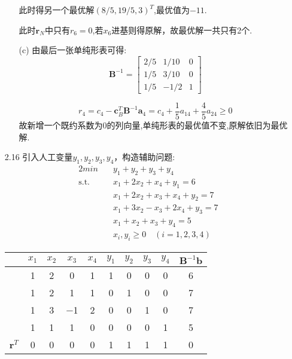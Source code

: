 \documentclass[UTF8]{ctexart}
\begin{document}
\begin{enumerate}
\begin{enumerate}
此时得另一个最优解$(8/5,19/5,3)^T$,最优值为$-11$.

此时$\bm{r}_N$中只有$r_6=0$,若$x_6$进基则得原解，故最优解一共只有2个.

\item[(c)]
由最后一张单纯形表可得:
\[\bm{B}^{-1}=\begin{bmatrix}
    2/5   & 1/10  & 0 \\
    1/5  & 3/10   & 0 \\
    1/5 & -1/2  & 1 
\end{bmatrix}\]

\[r_4=c_4-\bm{c}_B^T\bm{B}^{-1}\bm{a}_4=c_4+\dfrac{1}{5}a_{14}+\dfrac{4}{5}a_{24} \geq 0\]
故新增一个既约系数为0的列向量,单纯形表的最优值不变,原解依旧为最优解.
\end{enumerate}

\newpage
\item[2.16] 引入人工变量$y_1,y_2,y_3,y_4$，构造辅助问题:
\begin{alignat}{2}
min \quad & y_1+y_2+y_3+y_4 \nonumber\\
\mbox{s.t.}\quad
&x_1+2x_2+x_4+y_1=6\nonumber\\
&x_1+2x_2+x_3+x_4+y_2=7\nonumber\\
&x_1+3x_2-x_3+2x_4+y_3=7\nonumber\\
&x_1+x_2+x_3+y_4=5\nonumber\\
&x_i,y_i\geq 0\quad(i=1,2,3,4)
\end{alignat}

\begin{table}[ht]
\centering
	\begin{tabular}{cccccccccc}
	\toprule
	{}&$x_1$&$x_2$&$x_3$&$x_4$&$y_1$&$y_2$&$y_3$&$y_4$&$\bm{B}^{-1}\bm{b}$\\
	\midrule
   {}    & 1     & 2     & 0     & 1     & 1     & 0     & 0     & 0     & 6 \\
   {}    & 1     & 2     & 1     & 1     & 0     & 1     & 0     & 0     & 7 \\
   {}    & 1     & 3     & −1    & 2     & 0     & 0     & 1     & 0     & 7 \\
  {}    & 1     & 1     & 1     & 0     & 0     & 0     & 0     & 1     & 5 \\
   $\bm{r}^T$    & 0     & 0     & 0     & 0     & 1     & 1     & 1     & 1     & 0 \\
	\bottomrule
	\end{tabular}
\end{table}


\end{enumerate}
\end{document}
